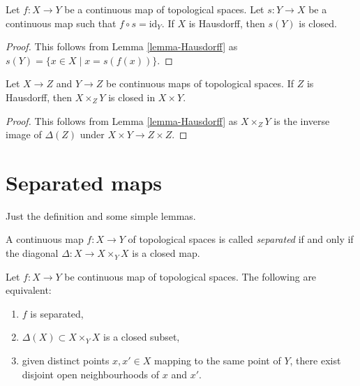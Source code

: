 \begin{lemma}
\label{lemma-section-closed}
Let $f : X \to Y$ be a continuous map of topological spaces.
Let $s : Y \to X$ be a continuous map such that $f \circ s = \text{id}_Y$.
If $X$ is Hausdorff, then $s(Y)$ is closed.
\end{lemma}

\begin{proof}
This follows from Lemma \ref{lemma-Hausdorff} as
$s(Y) = \{x \in X \mid x = s(f(x))\}$.
\end{proof}

\begin{lemma}
\label{lemma-fibre-product-closed}
Let $X \to Z$ and $Y \to Z$ be continuous maps of topological spaces.
If $Z$ is Hausdorff, then  $X \times_Z Y$ is closed in $X \times Y$.
\end{lemma}

\begin{proof}
This follows from Lemma \ref{lemma-Hausdorff} as
$X \times_Z Y$ is the inverse image of $\Delta(Z)$
under $X \times Y \to Z \times Z$.
\end{proof}




\section{Separated maps}
\label{section-separated}

\noindent
Just the definition and some simple lemmas.

\begin{definition}
\label{definition-separated}
A continuous map $f : X \to Y$ of topological spaces is called
{\it separated} if and only if the diagonal $\Delta : X \to X \times_Y X$
is a closed map.
\end{definition}

\begin{lemma}
\label{lemma-separated}
Let $f : X \to Y$ be continuous map of topological spaces.
The following are equivalent:
\begin{enumerate}
\item $f$ is separated,
\item $\Delta(X) \subset X \times_Y X$ is a closed subset,
\item given distinct points $x, x' \in X$ mapping to the same point of
$Y$, there exist disjoint open neighbourhoods of $x$ and $x'$.
\end{enumerate}
\end{lemma}

